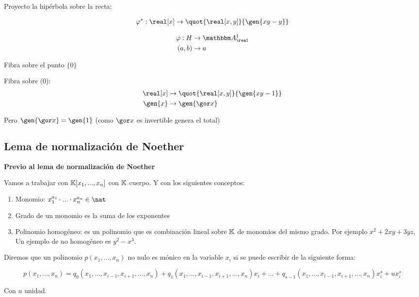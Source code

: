 \begin{example}
	Proyecto la hipérbola sobre la recta:
	
	\begin{align*}
		\varphi^*: \real[x]& \rightarrow \quot{\real[x,y]}{\gen{xy-y}} \\
	\end{align*}
	
		\begin{align*}
			\varphi: H & \rightarrow \A^1_{\real} \\
			(a,b) & \rightarrow a
		\end{align*}
	
		Fibra sobre el punto $\{0\}$
		
		Fibra sobre (0):
		\begin{align*}
			\real[x]& \rightarrow \quot{\real[x,y]}{\gen{xy-1}} \\
			\gen{x} & \rightarrow \gen{\cls{x}}
		\end{align*}
		
		Pero $\gen{\cls{x}} = \gen{1}$ (como $\cls{x}$ es invertible genera el total)
\end{example}

\subsection{Lema de normalización de Noether}

\textbf{Previo al lema de normalización de Noether}

Vamos a trabajar con $\mathbb{K}[x_1,...,x_n]$ con $\mathbb{K}$ cuerpo. Y con los siguientes conceptos:
\begin{enumerate}
	\item Monomio: $x_1^{a_1}\cdot...\cdot x_n^{a_n} \in \nat$
	\item Grado de un monomio es la suma de los exponentes
	\item Polinomio homogéneo: es un polinomio que es combinación lineal sobre $\mathbb{K}$ de monomios del mismo grado.
	Por ejemplo $x^2+2xy+3yz$, Un ejemplo de no homogéneo es $y^2-x^3$.
\end{enumerate}

\begin{defn}
	Diremos que un polinomio $p(x_1,...,x_n)$ no nulo es mónico en la variable $x_i$ si se puede escribir de la siguiente forma:
	
	$$ p(x_1,...,x_n) = q_0(x_1,...,x_{i-1},x_{i+1},...,x_n)+q_1(x_1,...,x_{i-1},x_{i+1},...,x_n)x_i+...+q_{s-1}(x_1,...,x_{i-1},x_{i+1},...,x_n)x_i^s+ux_i^s $$	
	
	Con $u$ unidad.
\end{defn}

